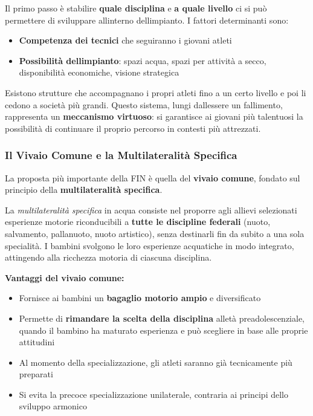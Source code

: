 \documentclass[a4paper,11pt]{article}
\providecommand{\tightlist}{%
  \setlength{\itemsep}{0pt}\setlength{\parskip}{0pt}}
\begin{document}
Il primo passo è stabilire \textbf{quale disciplina} e \textbf{a quale
      livello} ci si può permettere di sviluppare all\textquotesingle interno
dell\textquotesingle impianto. I fattori determinanti sono:

\begin{itemize}
      \tightlist
      \item
            \textbf{Competenza dei tecnici} che seguiranno i giovani atleti
      \item
            \textbf{Possibilità dell\textquotesingle impianto}: spazi acqua, spazi
            per attività a secco, disponibilità economiche, visione strategica
\end{itemize}

Esistono strutture che accompagnano i propri atleti fino a un certo
livello e poi li cedono a società più grandi. Questo sistema, lungi
dall\textquotesingle essere un fallimento, rappresenta un
\textbf{meccanismo virtuoso}: si garantisce ai giovani più talentuosi la
possibilità di continuare il proprio percorso in contesti più
attrezzati.

\subsubsection{Il Vivaio Comune e la Multilateralità
      Specifica}\label{il-vivaio-comune-e-la-multilateralituxe0-specifica}

La proposta più importante della FIN è quella del \textbf{vivaio
      comune}, fondato sul principio della \textbf{multilateralità specifica}.

La \emph{multilateralità specifica} in acqua consiste nel proporre agli
allievi selezionati esperienze motorie riconducibili a \textbf{tutte le
      discipline federali} (nuoto, salvamento, pallanuoto, nuoto artistico),
senza destinarli fin da subito a una sola specialità. I bambini svolgono
le loro esperienze acquatiche in modo integrato, attingendo alla
ricchezza motoria di ciascuna disciplina.

\textbf{Vantaggi del vivaio comune:}

\begin{itemize}
      \tightlist
      \item
            Fornisce ai bambini un \textbf{bagaglio motorio ampio} e diversificato
      \item
            Permette di \textbf{rimandare la scelta della disciplina}
            all\textquotesingle età preadolescenziale, quando il bambino ha
            maturato esperienza e può scegliere in base alle proprie attitudini
      \item
            Al momento della specializzazione, gli atleti saranno già tecnicamente
            più preparati
      \item
            Si evita la precoce specializzazione unilaterale, contraria ai
            principi dello sviluppo armonico
\end{itemize}
\end{document}
